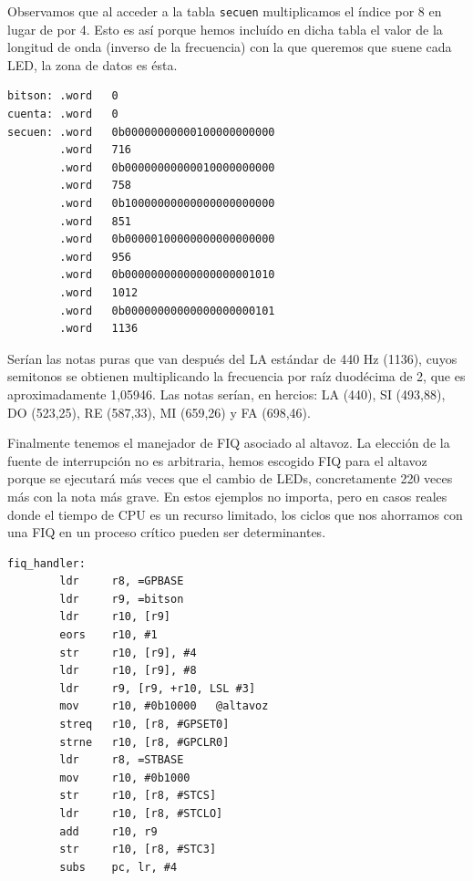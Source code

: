 Observamos que al acceder a la tabla {\tt secuen} multiplicamos el índice por 8 en lugar de
por 4. Esto es así porque hemos incluído en dicha tabla el valor de la longitud de onda (inverso
de la frecuencia) con la que queremos que suene cada LED, la zona de datos es ésta.

\begin{lstlisting}
bitson: .word   0
cuenta: .word   0
secuen: .word   0b00000000000100000000000
        .word   716
        .word   0b00000000000010000000000
        .word   758
        .word   0b10000000000000000000000
        .word   851
        .word   0b00000100000000000000000
        .word   956
        .word   0b00000000000000000001010
        .word   1012
        .word   0b00000000000000000000101
        .word   1136
\end{lstlisting}

Serían las notas puras que van después del LA estándar de 440 Hz (1136), cuyos semitonos se
obtienen multiplicando la frecuencia por raíz duodécima de 2, que es aproximadamente 1,05946.
Las notas serían, en hercios: LA (440), SI (493,88), DO (523,25), RE (587,33), MI (659,26) y
FA (698,46).

Finalmente tenemos el manejador de FIQ asociado al altavoz. La elección de la fuente de
interrupción no es arbitraria, hemos escogido FIQ para el altavoz porque se ejecutará más veces
que el cambio de LEDs, concretamente 220 veces más con la nota más grave. En estos ejemplos
no importa, pero en casos reales donde el tiempo de CPU es un recurso limitado, los ciclos
que nos ahorramos con una FIQ en un proceso crítico pueden ser determinantes.

\begin{lstlisting}
fiq_handler:
        ldr     r8, =GPBASE
        ldr     r9, =bitson
        ldr     r10, [r9]
        eors    r10, #1
        str     r10, [r9], #4
        ldr     r10, [r9], #8
        ldr     r9, [r9, +r10, LSL #3]
        mov     r10, #0b10000   @altavoz
        streq   r10, [r8, #GPSET0]
        strne   r10, [r8, #GPCLR0]
        ldr     r8, =STBASE
        mov     r10, #0b1000
        str     r10, [r8, #STCS]
        ldr     r10, [r8, #STCLO]
        add     r10, r9
        str     r10, [r8, #STC3]
        subs    pc, lr, #4
\end{lstlisting}

